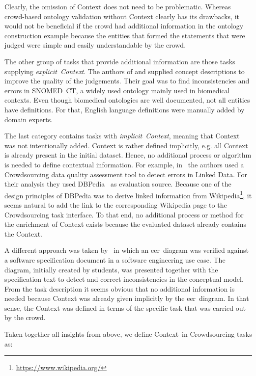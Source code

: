 Clearly, the omission of Context does not need to be problematic. Whereas crowd-based ontology validation without Context clearly has its drawbacks, it would not be beneficial if the crowd had additional information in the ontology construction example because the entities that formed the statements that were judged were simple and easily understandable by the crowd. 

The other group of tasks that provide additional information are those tasks supplying \emph{explicit~Context}. The authors of \cite{mortensen2015} and \cite{mortensen2016} supplied concept descriptions to improve the quality of the judgements. Their goal was to find inconsistencies and errors in SNOMED~CT, a widely used ontology mainly used in biomedical contexts. Even though biomedical ontologies are well documented, not all entities have definitions. For that, English language definitions were manually added by domain experts. 

The last category contains tasks with \emph{implicit~Context}, meaning that Context was not intentionally added. Context is rather defined implicitly, e.g. all Context is already present in the initial dataset. Hence, no additional process or algorithm is needed to define contextual information. For example, in~\cite{acosta2018} the authors used a Crowdsourcing data quality assessment tool to detect errors in Linked Data. 
For their analysis they used DBPedia~\cite{auer2007} as evaluation source. Because one of the design principles of DBPedia was to derive linked information from Wikipedia\footnote{\url{https://www.wikipedia.org/}}, it seems natural to add the link to the corresponding Wikipedia page to the Crowdsourcing task interface. To that end, no additional process or method for the enrichment of Context exists because the evaluated dataset already contains the Context.

A different approach was taken by~\cite{sabou2018, winkler2017, winkler2017_2} in which an \gls{eer}~diagram was verified against a software specification document in a software engineering use case. The diagram, initially created by students, was presented together with the specification text to detect and correct inconsistencies in the conceptual model. From the task description it seems obvious that no additional information is needed because Context was already given implicitly by the \gls{eer}~diagram. In that sense, the Context was defined in terms of the specific task that was carried out by the crowd. 

Taken together all insights from above, we define \guillemotright Context\guillemotleft~in Crowdsourcing tasks as:

